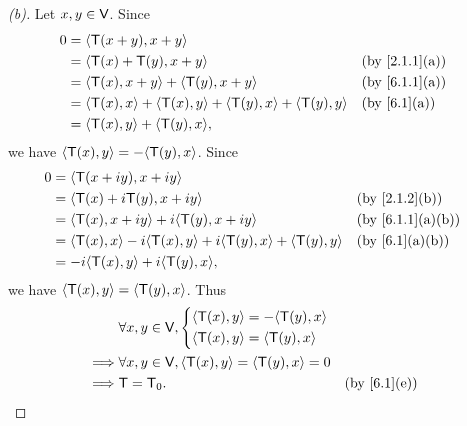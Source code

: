 \begin{proof}[(b)]
  Let \(x, y \in \mathsf{V}\).
  Since
  \begin{align*}
    0 & = \inn{\T(x + y), x + y}                                                               \\
      & = \inn{\T(x) + \T(y), x + y}                                        &  & \by{2.1.1}[a] \\
      & = \inn{\T(x), x + y} + \inn{\T(y), x + y}                           &  & \by{6.1.1}[a] \\
      & = \inn{\T(x), x} + \inn{\T(x), y} + \inn{\T(y), x} + \inn{\T(y), y} &  & \by{6.1}[a]   \\
      & = \inn{\T(x), y} + \inn{\T(y), x},
  \end{align*}
  we have \(\inn{\T(x), y} = - \inn{\T(y), x}\).
  Since
  \begin{align*}
    0 & = \inn{\T(x + iy), x + iy}                                                                   \\
      & = \inn{\T(x) + i \T(y), x + iy}                                         &  & \by{2.1.2}[b]   \\
      & = \inn{\T(x), x + iy} + i \inn{\T(y), x + iy}                           &  & \by{6.1.1}[a,b] \\
      & = \inn{\T(x), x} - i \inn{\T(x), y} + i \inn{\T(y), x} + \inn{\T(y), y} &  & \by{6.1}[a,b]   \\
      & = -i \inn{\T(x), y} + i \inn{\T(y), x},
  \end{align*}
  we have \(\left\langle\mathsf{T}(x), y\right\rangle = \left\langle\mathsf{T}(y), x\right\rangle\).
  Thus
  \begin{align*}
             & \forall x, y \in \V, \begin{dcases}
                                      \inn{\T(x), y} = - \inn{\T(y), x} \\
                                      \inn{\T(x), y} = \inn{\T(y), x}
                                    \end{dcases}                    \\
    \implies & \forall x, y \in \V, \inn{\T(x), y} = \inn{\T(y), x} = 0                  \\
    \implies & \T = \zT.                                                &  & \by{6.1}[e]
  \end{align*}
\end{proof}


